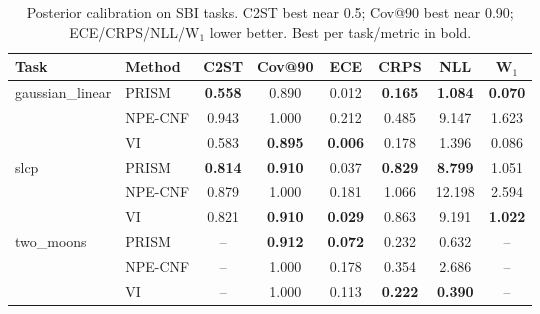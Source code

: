 \begin{table}[t]
\centering
\caption{Posterior calibration on SBI tasks. C2ST best near 0.5; Cov@90 best near 0.90; ECE/CRPS/NLL/W$_1$ lower better. Best per task/metric in bold.}
\label{tab:calibration}
\begin{tabular}{llcccccc}
\toprule
Task & Method & C2ST & Cov@90 & ECE & CRPS & NLL & W$_1$ \\
\midrule
gaussian\_linear & PRISM & \textbf{0.558} & 0.890 & 0.012 & \textbf{0.165} & \textbf{1.084} & \textbf{0.070} \\
 & NPE-CNF & 0.943 & 1.000 & 0.212 & 0.485 & 9.147 & 1.623 \\
 & VI & 0.583 & \textbf{0.895} & \textbf{0.006} & 0.178 & 1.396 & 0.086 \\
\midrule
slcp & PRISM & \textbf{0.814} & \textbf{0.910} & 0.037 & \textbf{0.829} & \textbf{8.799} & 1.051 \\
 & NPE-CNF & 0.879 & 1.000 & 0.181 & 1.066 & 12.198 & 2.594 \\
 & VI & 0.821 & \textbf{0.910} & \textbf{0.029} & 0.863 & 9.191 & \textbf{1.022} \\
\midrule
two\_moons & PRISM & -- & \textbf{0.912} & \textbf{0.072} & 0.232 & 0.632 & -- \\
 & NPE-CNF & -- & 1.000 & 0.178 & 0.354 & 2.686 & -- \\
 & VI & -- & 1.000 & 0.113 & \textbf{0.222} & \textbf{0.390} & -- \\
\bottomrule
\end{tabular}
\end{table}
